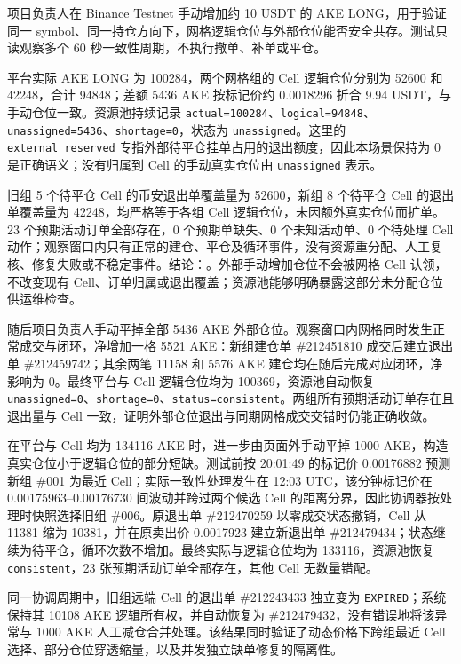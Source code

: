 项目负责人在 Binance Testnet 手动增加约 10 USDT 的 AKE LONG，用于验证同一 symbol、同一持仓方向下，网格逻辑仓位与外部仓位能否安全共存。测试只读观察多个 60 秒一致性周期，不执行撤单、补单或平仓。

平台实际 AKE LONG 为 100284，两个网格组的 Cell 逻辑仓位分别为 52600 和 42248，合计 94848；差额 5436 AKE 按标记价约 0.0018296 折合 9.94 USDT，与手动仓位一致。资源池持续记录 \texttt{actual=100284}、\texttt{logical=94848}、\texttt{unassigned=5436}、\texttt{shortage=0}，状态为 \texttt{unassigned}。这里的 \texttt{external\_reserved} 专指外部待平仓挂单占用的退出额度，因此本场景保持为 0 是正确语义；没有归属到 Cell 的手动真实仓位由 \texttt{unassigned} 表示。

旧组 5 个待平仓 Cell 的币安退出单覆盖量为 52600，新组 8 个待平仓 Cell 的退出单覆盖量为 42248，均严格等于各组 Cell 逻辑仓位，未因额外真实仓位而扩单。23 个预期活动订单全部存在，0 个预期单缺失、0 个未知活动单、0 个待处理 Cell 动作；观察窗口内只有正常的建仓、平仓及循环事件，没有资源重分配、人工复核、修复失败或不稳定事件。结论：\StatusPass。外部手动增加仓位不会被网格 Cell 认领，不改变现有 Cell、订单归属或退出覆盖；资源池能够明确暴露这部分未分配仓位供运维检查。

随后项目负责人手动平掉全部 5436 AKE 外部仓位。观察窗口内网格同时发生正常成交与闭环，净增加一格 5521 AKE：新组建仓单 \#212451810 成交后建立退出单 \#212459742；其余两笔 11158 和 5576 AKE 建仓均在随后完成对应闭环，净影响为 0。最终平台与 Cell 逻辑仓位均为 100369，资源池自动恢复 \texttt{unassigned=0}、\texttt{shortage=0}、\texttt{status=consistent}。两组所有预期活动订单存在且退出量与 Cell 一致，证明外部仓位退出与同期网格成交交错时仍能正确收敛。

在平台与 Cell 均为 134116 AKE 时，进一步由页面外手动平掉 1000 AKE，构造真实仓位小于逻辑仓位的部分短缺。测试前按 20:01:49 的标记价 0.00176882 预测新组 \#001 为最近 Cell；实际一致性处理发生在 12:03 UTC，该分钟标记价在 0.00175963--0.00176730 间波动并跨过两个候选 Cell 的距离分界，因此协调器按处理时快照选择旧组 \#006。原退出单 \#212470259 以零成交状态撤销，Cell 从 11381 缩为 10381，并在原卖出价 0.0017923 建立新退出单 \#212479434；状态继续为待平仓，循环次数不增加。最终实际与逻辑仓位均为 133116，资源池恢复 \texttt{consistent}，23 张预期活动订单全部存在，其他 Cell 无数量错配。

同一协调周期中，旧组远端 Cell 的退出单 \#212243433 独立变为 \texttt{EXPIRED}；系统保持其 10108 AKE 逻辑所有权，并自动恢复为 \#212479432，没有错误地将该异常与 1000 AKE 人工减仓合并处理。该结果同时验证了动态价格下跨组最近 Cell 选择、部分仓位穿透缩量，以及并发独立缺单修复的隔离性。

